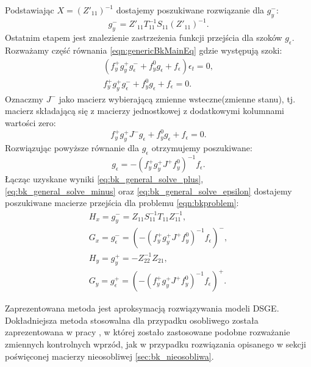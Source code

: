 Podstawiając $X = (Z'_{11})^{-1}$ dostajemy poszukiwane rozwiązanie dla $g_y^-$:
\begin{equation}
    \label{eq:bk_general_solve_minus}
    g_y^- = Z'_{11}T_{11}^{-1}S_{11}(Z'_{11})^{-1}.
\end{equation}
Ostatnim etapem jest znalezienie zastrzeżenia funkcji przejścia dla szoków $g_\epsilon$. Rozważamy część równania \eqref{eqn:genericBkMainEq} gdzie występują szoki:
\begin{equation}
\begin{gathered}
    (f_y^+ g_y^+ g_\epsilon^- + f_y^0 g_\epsilon + f_\epsilon) \epsilon_t = 0, \\
    f_y^+ g_y^+ g_\epsilon^- + f_y^0 g_\epsilon + f_\epsilon = 0.
\end{gathered}
\end{equation}
Oznaczmy $J^-$ jako macierz wybierającą zmienne wsteczne(zmienne stanu), tj. macierz składającą się z macierzy jednostkowej z dodatkowymi kolumnami wartości zero:
\begin{equation}
    f_y^+ g_y^+ J^- g_\epsilon + f_y^0 g_\epsilon + f_\epsilon = 0.
\end{equation}
Rozwiązując powyższe równanie dla $g_\epsilon$ otrzymujemy poszukiwane:
\begin{equation}
    \label{eq:bk_general_solve_epsilon}
    g_\epsilon = - (f_y^+ g_y^+ J^ + f_y^0)^{-1} f_\epsilon.
\end{equation}
Łącząc uzyskane wyniki \eqref{eq:bk_general_solve_plus}, \eqref{eq:bk_general_solve_minus} oraz \eqref{eq:bk_general_solve_epsilon} dostajemy poszukiwane macierze przejścia dla problemu \eqref{eqn:bkproblem}:
\begin{equation}
    \label{eq:bk_general_solution_final}
    \begin{gathered}
        H_x = g_y^- = Z_{11} S_{11}^{-1} T_{11} Z_{11}^{-1},\\
        G_x = g_\epsilon^- = (- (f_y^+ g_y^+ J^ + f_y^0)^{-1} f_\epsilon)^-,\\
        H_y = g_y^+ = -Z_{22}^{-1} Z_{21},\\
        G_y = g_\epsilon^+ = (- (f_y^+ g_y^+ J^ + f_y^0)^{-1} f_\epsilon)^+.
    \end{gathered}
\end{equation}

Zaprezentowana metoda jest aproksymacją rozwiązywania modeli DSGE. Dokładniejsza metoda stosowalna dla przypadku osobliwego została zaprezentowana w pracy \cite{KLEIN20001405}, w której zostało zastosowane podobne rozważanie zmiennych kontrolnych wprzód, jak w przypadku rozwiązania opisanego w sekcji poświęconej macierzy nieosobliwej \ref{sec:bk_nieosobliwa}.

